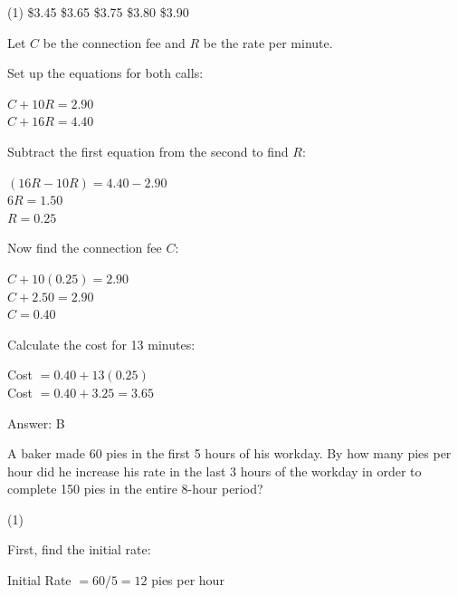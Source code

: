 \documentclass[11pt,paper=a4,answers]{exam}
\begin{document}
\begin{questions}
\begin{tasks}(1)
\task[A)] \$3.45
\task[B)] \$3.65
\task[C)] \$3.75
\task[D)] \$3.80
\task[E)] \$3.90
\end{tasks}

\begin{solution}
Let $C$ be the connection fee and $R$ be the rate per minute.
\vspace{5pt}

Set up the equations for both calls:
\begin{center}
$C + 10R = 2.90$ \\
$C + 16R = 4.40$
\end{center}
\vspace{5pt}

Subtract the first equation from the second to find $R$:
\begin{center}
$(16R - 10R) = 4.40 - 2.90$ \\
$6R = 1.50$ \\
$R = 0.25$
\end{center}
\vspace{5pt}

Now find the connection fee $C$:
\begin{center}
$C + 10(0.25) = 2.90$ \\
$C + 2.50 = 2.90$ \\
$C = 0.40$
\end{center}
\vspace{5pt}

Calculate the cost for 13 minutes:
\begin{center}
Cost $= 0.40 + 13(0.25)$ \\
Cost $= 0.40 + 3.25 = 3.65$
\end{center}

Answer: \colorbox{yellow!100}{B}
\end{solution}

\vspace{1cm}

\question
A baker made 60 pies in the first 5 hours of his workday. By how many pies per hour did he increase his rate in the last 3 hours of the workday in order to complete 150 pies in the entire 8-hour period?

\begin{tasks}(1)
\end{tasks}

\begin{solution}
First, find the initial rate:
\begin{center}
Initial Rate $= 60 / 5 = 12$ pies per hour
\end{center}
\vspace{5pt}


\end{solution}
\end{questions}
\end{document}
